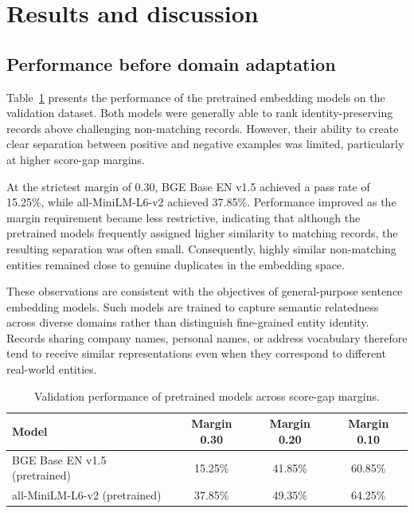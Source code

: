 \documentclass{article}
\begin{document}
\section{Results and discussion}
\label{sec:results}

\subsection{Performance before domain adaptation}

Table~\ref{tab:pretrained} presents the performance of the pretrained embedding models on the validation dataset. Both models were generally able to rank identity-preserving records above challenging non-matching records. However, their ability to create clear separation between positive and negative examples was limited, particularly at higher score-gap margins.

At the strictest margin of 0.30, BGE Base EN v1.5 achieved a pass rate of 15.25\%, while all-MiniLM-L6-v2 achieved 37.85\%. Performance improved as the margin requirement became less restrictive, indicating that although the pretrained models frequently assigned higher similarity to matching records, the resulting separation was often small. Consequently, highly similar non-matching entities remained close to genuine duplicates in the embedding space.

These observations are consistent with the objectives of general-purpose sentence embedding models. Such models are trained to capture semantic relatedness across diverse domains rather than distinguish fine-grained entity identity. Records sharing company names, personal names, or address vocabulary therefore tend to receive similar representations even when they correspond to different real-world entities.

\begin{table}[t]
  \caption{Validation performance of pretrained models across score-gap margins.}
  \label{tab:pretrained}
  \centering
  \begin{tabular}{lccc}
    \toprule
    Model & Margin 0.30 & Margin 0.20 & Margin 0.10 \\
    \midrule
    BGE Base EN v1.5 (pretrained)  & 15.25\% & 41.85\% & 60.85\% \\
    all-MiniLM-L6-v2 (pretrained) & 37.85\% & 49.35\% & 64.25\% \\
    \bottomrule
  \end{tabular}
\end{table}
\end{document}
